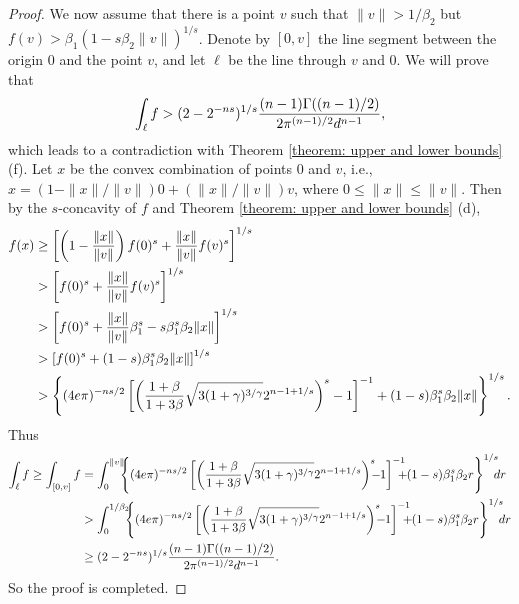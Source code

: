 \documentclass[11pt]{article}
\newcommand{\red}[1]{{\color{black}#1}}
\begin{document}
{{{{\begin{proof}
We now assume that there is a point $v$ such that $\|v\|>1/\beta_2$ but $f(v)>\beta_1(1-s\beta_2\|v\|)^{1/s}$. Denote by $[0,v]$ the line segment between the origin $0$ and the point $v$, and let $\ell$ be the line through $v$ and $0$. We will prove that
\begin{equation*}
\int_\ell f > \red{(2-2^{-ns})^{1/s}\frac{(n-1)\Gamma((n-1)/2)}{2\pi^{(n-1)/2}d^{n-1}},}
\end{equation*}
which leads to a contradiction with Theorem \ref{theorem: upper and lower bounds} (f). Let $x$ be the convex combination of points $0$ and $v$, i.e., $x=(1-\|x\|/\|v\|)0+(\|x\|/\|v\|)v$, where $0\le \|x\|\le\|v\|$. Then by the $s$-concavity of $f$ and Theorem \ref{theorem: upper and lower bounds} (d),
\begin{equation*}
\begin{split}
f(x)&\ge \left[\left(1-\frac{\|x\|}{\|v\|}\right)f(0)^s+\frac{\|x\|}{\|v\|}f(v)^s\right]^{1/s}\\&> \red{\left[f(0)^s+\frac{\|x\|}{\|v\|}f(v)^s\right]^{1/s}}\\
&> \left[f(0)^s+\frac{\|x\|}{\|v\|}\beta_1^s-s\beta_1^s\beta_2\|x\|\right]^{1/s}\\&>\left[f(0)^s+(1-s)\beta_1^s\beta_2\|x\|\right]^{1/s}\\
&> \left\{(4e\pi)^{-ns/2}\left[\left(\frac{1+\beta}{1+3\beta}\sqrt{3(1+\gamma)^{3/\gamma}}2^{n-1+1/s}\right)^{s}-1\right]^{-1}+(1-s)\beta_1^s\beta_2\red{\|x\|}\right\}^{1/s}.
\end{split}
\end{equation*}
Thus
\begin{equation*}
\begin{split}
\int_\ell f\ge \int_{[0,v]}f&=\int_0^{\|v\|} \hspace{-0.2cm}\left\{(4e\pi)^{-ns/2}\left[\left(\frac{1+\beta}{1+3\beta}\sqrt{3(1+\gamma)^{3/\gamma}}2^{n-1+1/s}\right)^{s}\hspace{-0.2cm}-\hspace{-0.1cm}1\right]^{-1}\hspace{-0.3cm}+\hspace{-0.1cm}(1-s)\beta_1^s\beta_2r\right\}^{1/s}\hspace{-0.2cm} dr\\
&>\int_0^{1/\beta_2} \hspace{-0.2cm}\left\{(4e\pi)^{-ns/2}\left[\left(\frac{1+\beta}{1+3\beta}\sqrt{3(1+\gamma)^{3/\gamma}}2^{n-1+1/s}\right)^{s}\hspace{-0.2cm}-\hspace{-0.1cm}1\right]^{-1}\hspace{-0.3cm}+\hspace{-0.1cm}(1-s)\beta_1^s\beta_2r\right\}^{1/s}\hspace{-0.2cm} dr\\
&\ge \red{(2-2^{-ns})^{1/s}\frac{(n-1)\Gamma((n-1)/2)}{2\pi^{(n-1)/2}d^{n-1}}.}
\end{split}
\end{equation*}
So the proof is completed.
\end{proof}


}}}}
\end{document}
